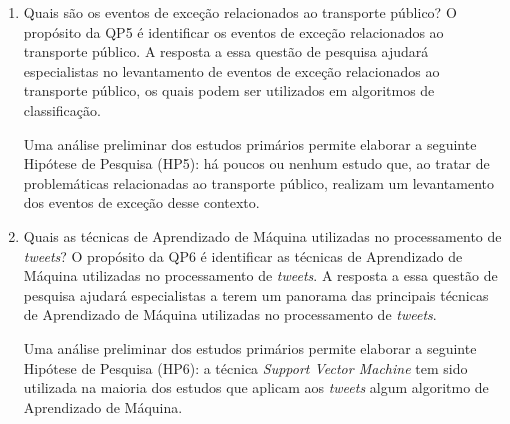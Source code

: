 \documentclass[
	12pt,				%
	oneside,			%
	a4paper,			%
	english,			%
	brazil				%
	]{abntex2ppgsi}
\begin{document}
{{\begin{enumerate}
Uma análise preliminar dos estudos primários permite elaborar a seguinte Hipótese de Pesquisa (HP4): o principal paradigma utilizado tem sido o processamento de \textit{tweets} em \textit{batch} (\textit{offline}), após um processo de armazenamento. Poucos são os estudos que constroem uma plataforma para processamento de dados em tempo real. \newline

\item Quais são os eventos de exceção relacionados ao transporte público?
\label{item:5} \newline \newline
O propósito da QP5 é identificar os eventos de exceção relacionados ao transporte público. A resposta a essa questão de pesquisa ajudará especialistas no levantamento de eventos de exceção relacionados ao transporte público, os quais podem ser utilizados em algoritmos de classificação.\newline

Uma análise preliminar dos estudos primários permite elaborar a seguinte Hipótese de Pesquisa (HP5): há poucos ou nenhum estudo que, ao tratar de problemáticas relacionadas ao transporte público, realizam um levantamento dos eventos de exceção desse contexto.\newline

\item Quais as técnicas de Aprendizado de Máquina utilizadas no processamento de \textit{tweets}?
\label{item:6} \newline \newline
O propósito da QP6 é identificar as técnicas de Aprendizado de Máquina utilizadas no processamento de \textit{tweets}. A resposta a essa questão de pesquisa ajudará especialistas a terem um panorama das principais técnicas de Aprendizado de Máquina utilizadas no processamento de \textit{tweets}. \newline

Uma análise preliminar dos estudos primários permite elaborar a seguinte Hipótese de Pesquisa (HP6): a técnica \textit{Support Vector Machine} tem sido utilizada na maioria dos estudos que aplicam aos \textit{tweets} algum algoritmo de Aprendizado de Máquina.\newline
\end{enumerate}

}}
\end{document}
